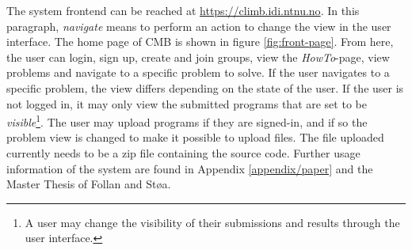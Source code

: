 The system frontend can be reached at \url{https://climb.idi.ntnu.no}. In this paragraph, \textit{navigate} means to perform an action to change the view in the user interface. The home page of CMB is shown in figure \ref{fig:front-page}. From here, the user can login, sign up, create and join groups, view the \textit{HowTo}-page, view problems and navigate to a specific problem to solve. If the user navigates to a specific problem, the view differs depending on the state of the user. If the user is not logged in, it may only view the submitted programs that are set to be \textit{visible}\footnote{A user may change the visibility of their submissions and results through the user interface.}. The user may upload programs if they are signed-in, and if so the problem view is changed to make it possible to upload files. The file uploaded currently needs to be a zip file containing the source code. Further usage information of the system are found in Appendix \ref{appendix/paper} and the Master Thesis of Follan and Støa. \\

